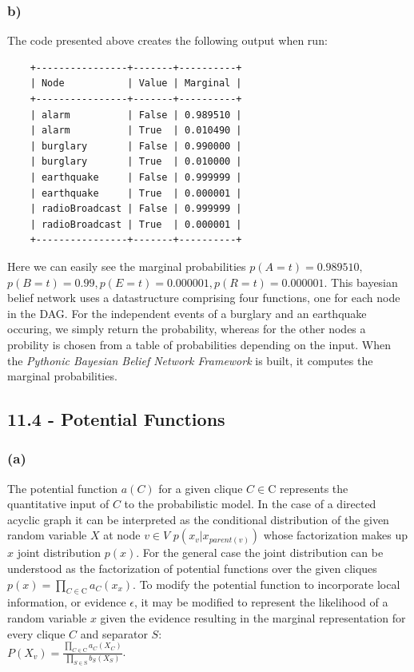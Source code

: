 \documentclass[11pt,a4paper]{article}
\begin{document}
	\subsubsection*{b)}
	The code presented above creates the following output when run:
	\begin{verbatim}
	+----------------+-------+----------+
	| Node           | Value | Marginal |
	+----------------+-------+----------+
	| alarm          | False | 0.989510 |
	| alarm          | True  | 0.010490 |
	| burglary       | False | 0.990000 |
	| burglary       | True  | 0.010000 |
	| earthquake     | False | 0.999999 |
	| earthquake     | True  | 0.000001 |
	| radioBroadcast | False | 0.999999 |
	| radioBroadcast | True  | 0.000001 |
	+----------------+-------+----------+
	\end{verbatim}
	Here we can easily see the marginal probabilities $p(A = t) = 0.989510,$ \\$p(B = t) = 0.99, p(E = t) = 0.000001, p(R = t) = 0.000001$.
	This bayesian belief network uses a datastructure comprising four functions, one for each node in the DAG. For the independent events of a burglary and an earthquake occuring, we simply return the probability, whereas for the other nodes a probility is chosen from a table of probabilities depending on the input. When the \textit{Pythonic Bayesian Belief Network Framework} is built, it computes the marginal probabilities.
	
	\subsection*{11.4 - Potential Functions}
	\subsubsection*{(a)}
	The potential function $a(C)$ for a given clique $C \in \mathrm{C}$ represents the quantitative input of $C$ to the probabilistic model. In the case of a directed acyclic graph it can be interpreted as the conditional distribution of the given random variable $X$ at node $v \in V$ $p(x_{v}|x_{parent(v)})$ whose factorization makes up $x$ joint distribution $p(x)$. For the general case the joint distribution can be understood as the factorization of potential functions over the given cliques $p(x) = \prod_{C \in \mathrm{C}}a_{C}(x_{x})$. To modify the potential function to incorporate local information, or evidence $\epsilon$, it may be modified to represent the likelihood of a random variable $x$ given the evidence resulting in the marginal representation for every clique $C$ and separator $S$:\\
	$P(X_{v}) = \frac{\prod_{C \in \mathrm{C}}a_{C}(X_{C})}{\prod_{S \in \mathrm{S}}b_{S}(X_{S})}$.
	
\end{document}
